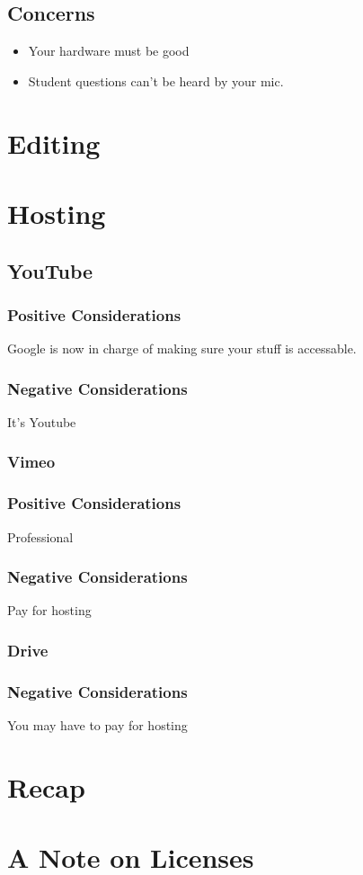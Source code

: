 \documentclass[sigconf]{acmart}
\begin{document}
\subsection{Concerns}
\begin{itemize}
	\item Your hardware must be good
	\item Student questions can't be heard by your mic.
\end{itemize}

\subsection{}

\section{Editing}

\section{Hosting}

\subsection{YouTube}


\subsubsection{Positive Considerations}
Google is now in charge of making sure your stuff is accessable.


\subsubsection{Negative Considerations}

It's Youtube

\subsubsection{Vimeo}

\subsubsection{Positive Considerations}
Professional

\subsubsection{Negative Considerations}
Pay for hosting


\subsubsection{Drive}



\subsubsection{Negative Considerations}
You may have to pay for hosting



\section{Recap}

\section{A Note on Licenses}
\end{document}
